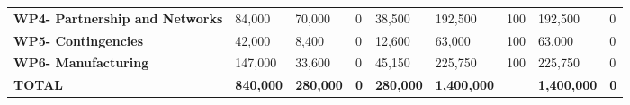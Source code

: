 \begin{landscape}
\begin{table}[H]
{\begin{tabular}{p{5cm}p{2cm}p{2cm}p{2.5cm}p{2cm}p{2cm}p{2cm}p{2cm}p{2cm}}
    \textbf{WP4- Partnership and Networks} & 84,000                                                                 & 70,000                                                             &0                                                                                 & 38,500                                                                       & 192,500                                                                                       & 100                          & 192,500                         & 0                                                                         \\
    \textbf{WP5- Contingencies}                                                        & 42,000                                                                 & 8,400                                                              &0                                                                                 & 12,600                                                                       & 63,000                                                                                        & 100                          & 63,000                          & 0                                                                         \\
    \textbf{WP6- Manufacturing}                                                        & 147,000                                                                & 33,600                                                             &0                                                                                 & 45,150                                                                       & 225,750                                                                                       & 100                          & 225,750                         & 0                                                                         \\ \hline
    \textbf{TOTAL}                                                                     & \textbf{840,000}                                                       & \textbf{280,000}                                                   & \textbf{0}                                                                      & \textbf{280,000}                                                             & \textbf{1,400,000}                                                                            & \textbf{}                    & \textbf{1,400,000}              & \textbf{0}                                                               
     \\ \bottomrule[2pt]
    \end{tabular} }
    \end{table}



\end{landscape}
